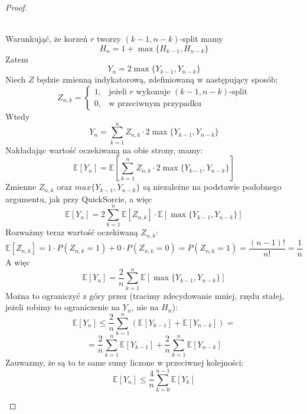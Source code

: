 \documentclass[11pt,a4paper]{article}
\begin{document}
\begin{proof}
\begin{enumerate}
\begin{center}
            \end{center}
            \\
            Warunkująć, że korzeń $r$ tworzy $(k-1, n-k)$-split mamy
            \[
                H_n = 1 + \max\{H_{k-1}, H_{n-k}\}
            \]
            Zatem
            \[
                Y_n = 2\max\{Y_{k-1}, Y_{n-k}\}
            \]
            Niech $Z$ będzie zmienną indykatorową, zdefiniowaną w następujący sposób:
            \[
                Z_{n,k} = \begin{cases}
                    1, & \text{jeżeli $r$ wykonuje } (k-1, n-k)\text{-split} \\
                    0, & \text{w przeciwnym przypadku}
                \end{cases}
            \]
            Wtedy
            \[
                Y_n = \sum_{k=1}^n Z_{n,k} \cdot 2 \max\{Y_{k-1}, Y_{n-k}\}
            \]
            Nakładając wartość oczekiwaną na obie strony, mamy:
            \[
                \mathbb{E}[Y_n] = \mathbb{E}\left[ \sum_{k=1}^n Z_{n,k} \cdot 2 \max\{Y_{k-1}, Y_{n-k}\} \right]
            \]
            Zmienne $Z_{n,k}$ oraz $max\{Y_{k-1}, Y_{n-k}\}$ są niezależne na podstawie podobnego argumentu, jak przy QuickSorcie, a więc
            \[
                \mathbb{E}[Y_n] = 2 \sum_{k=1}^n \mathbb{E}[Z_{n,k}] \cdot \mathbb{E}\left[\max\{Y_{k-1}, Y_{n-k}\}\right]
            \]
            Rozważmy teraz wartość oczekiwaną $Z_{n,k}$:
            \[
                \mathbb{E}[Z_{n,k}] = 1 \cdot P(Z_{n,k} = 1) + 0 \cdot P(Z_{n,k} = 0) = P(Z_{n,k} = 1) = \frac{(n-1)!}{n!} = \frac{1}{n}
            \]
            A więc
            \[
                \mathbb{E}[Y_n] = \frac{2}{n} \sum_{k=1}^n \mathbb{E}\left[\max\{Y_{k-1}, Y_{n-k}\}\right]
            \]
            Można to ograniczyć z góry przez (tracimy zdecydowanie mniej, rzędu stałej, jeżeli robimy to ograniczenie na $Y_n$, nie na $H_n$):
            \[
                \mathbb{E}[Y_n] \leq \frac{2}{n} \sum_{k=1}^n \left(\mathbb{E}[Y_{k-1}] + \mathbb{E}[Y_{n-k}]\right) =
            \]
            \[
                = \frac{2}{n} \sum_{k=1}^n \mathbb{E}[Y_{k-1}] + \frac{2}{n} \sum_{k=1}^n \mathbb{E}[Y_{n-k}]
            \]
            Zauwazmy, że są to te same sumy liczone w przeciwnej kolejności:
            \[
                \mathbb{E}[Y_n] \leq \frac{4}{n} \sum_{k=0}^{n-1} \mathbb{E}[Y_k]
\]
\end{enumerate}
\end{proof}
\end{document}

